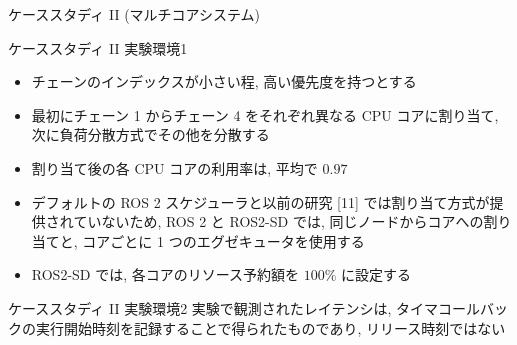 \begin{frame}{ケーススタディ II (マルチコアシステム)}
\end{frame}

\begin{frame}{ケーススタディ II 実験環境1}
    \begin{itemize}
        \item チェーンのインデックスが小さい程, 高い優先度を持つとする
        \item 最初にチェーン 1 からチェーン 4 をそれぞれ異なる CPU コアに割り当て, 次に負荷分散方式でその他を分散する
        \item 割り当て後の各 CPU コアの利用率は, 平均で $0.97$
        \item デフォルトの ROS 2 スケジューラと以前の研究 [11] では割り当て方式が提供されていないため, ROS 2 と ROS2-SD では, 同じノードからコアへの割り当てと, コアごとに 1 つのエグゼキュータを使用する
        \item ROS2-SD では, 各コアのリソース予約額を $100 \%$ に設定する
    \end{itemize}
\end{frame}

\begin{frame}[label=latency]{ケーススタディ II 実験環境2}
    実験で観測されたレイテンシは, タイマコールバックの実行開始時刻を記録することで得られたものであり, リリース時刻ではない
\end{frame}

